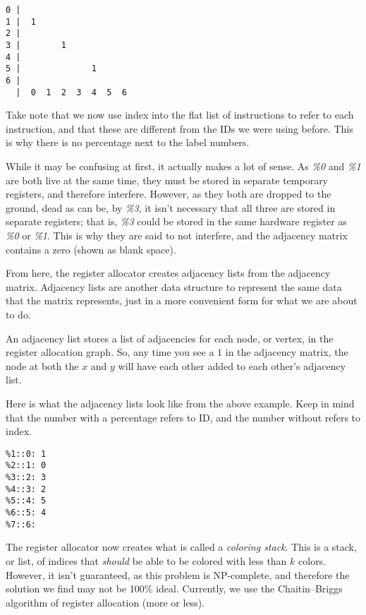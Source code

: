 \documentclass[
12pt,
letterpaper,
oneside,
]{memoir}
\begin{document}
\begin{verbatim}
0 |
1 |  1
2 |
3 |        1
4 |
5 |              1
6 |
  |  0  1  2  3  4  5  6
\end{verbatim}

\begin{center}
{\small Take note that we now use index into the flat list of instructions to refer to each instruction, and that these are different from the IDs we were using before. This is why there is no percentage next to the label numbers.}
\end{center}

While it may be confusing at first, it actually makes a lot of sense. As \emph{\%0} and \emph{\%1} are both live at the same time, they must be stored in separate temporary registers, and therefore interfere. However, as they both are dropped to the ground, dead as can be, by \emph{\%3}, it isn't necessary that all three are stored in separate registers; that is, \emph{\%3} could be stored in the same hardware register as \emph{\%0} or \emph{\%1}. This is why they are said to not interfere, and the adjacency matrix contains a zero (shown as blank space).

\filbreak

From here, the register allocator creates adjacency lists from the adjacency matrix. Adjacency lists are another data structure to represent the same data that the matrix represents, just in a more convenient form for what we are about to do.

An adjacency list stores a list of adjacencies for each node, or vertex, in the register allocation graph. So, any time you see a $1$ in the adjacency matrix, the node at both the $x$ and $y$ will have each other added to each other's adjacency list.

\filbreak

Here is what the adjacency lists look like from the above example. Keep in mind that the number with a percentage refers to ID, and the number without refers to index.

\begin{verbatim}
%1::0: 1
%2::1: 0
%3::2: 3
%4::3: 2
%5::4: 5
%6::5: 4
%7::6:
\end{verbatim}

\filbreak

The register allocator now creates what is called a \emph{coloring stack}. This is a stack, or list, of indices that \emph{should} be able to be colored with less than $k$ colors. However, it isn't guaranteed, as this problem is NP-complete, and therefore the solution we find may not be 100\% ideal. Currently, we use the Chaitin--Briggs algorithm of register allocation (more or less).
\end{document}
